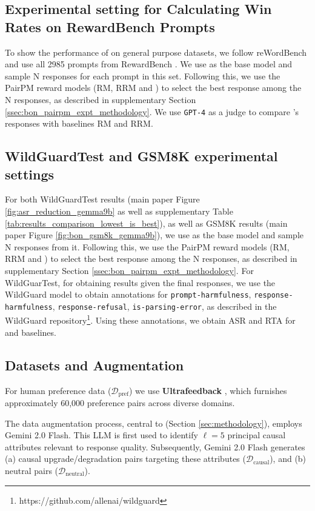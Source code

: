 \subsection{Experimental setting for Calculating Win Rates on RewardBench Prompts}
To show the performance of \carma{} on general purpose datasets, we follow reWordBench \citep{wu2025rewordbench} and use all 2985 prompts from RewardBench \citep{lambert2024rewardbench}. We use  as the base model and sample N responses for each prompt in this set. Following this, we use the PairPM reward models (RM, RRM and \carma{}) to select the best response among the N responses, as described in supplementary Section \ref{ssec:bon_pairpm_expt_methodology}. We use \texttt{GPT-4} as a judge to compare \carma{}'s responses with baselines RM and RRM.

\subsection{WildGuardTest and GSM8K experimental settings}
For both WildGuardTest results (main paper Figure \ref{fig:asr_reduction_gemma9b} as well as supplementary Table \ref{tab:results_comparison_lowest_is_best}), as well as GSM8K results (main paper Figure \ref{fig:bon_gsm8k_gemma9b}), we use  as the base model and sample N responses from it. Following this, we use the PairPM reward models (RM, RRM and \carma{}) to select the best response among the N responses, as described in supplementary Section \ref{ssec:bon_pairpm_expt_methodology}. For WildGuarTest, for obtaining results given the final responses, we use the WildGuard model \cite{wildguard2024} to obtain annotations for \texttt{prompt-harmfulness}, \texttt{response-harmfulness}, \texttt{response-refusal}, \texttt{is-parsing-error}, as described in the WildGuard repository\footnote{https://github.com/allenai/wildguard}. Using these annotations, we obtain ASR and RTA for \carma{} and baselines.

\subsection{Datasets and Augmentation}
\label{app:datasets_aug_details}

For human preference data ($\mathcal{D}_{\text{pref}}$) we use \textbf{Ultrafeedback} \citep{cui2023ultrafeedback}, which furnishes approximately 60,000 preference pairs across diverse domains. 

The data augmentation process, central to \carma{} (Section \ref{sec:methodology}), employs Gemini 2.0 Flash. This LLM is first used to identify $\ell=5$ principal causal attributes relevant to response quality. Subsequently, Gemini 2.0 Flash generates (a) causal upgrade/degradation pairs targeting these attributes ($\mathcal{D}_{\text{causal}}$), and (b) neutral pairs ($\mathcal{D}_{\text{neutral}}$).

